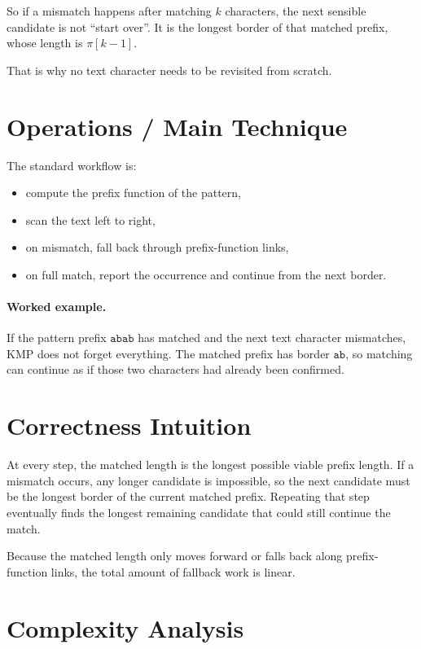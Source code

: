 So if a mismatch happens after matching \(k\) characters, the next sensible candidate is not ``start over''. It is the
longest border of that matched prefix, whose length is \(\pi[k - 1]\).

That is why no text character needs to be revisited from scratch.

\section*{Operations / Main Technique}

The standard workflow is:

\begin{itemize}
  \item compute the prefix function of the pattern,
  \item scan the text left to right,
  \item on mismatch, fall back through prefix-function links,
  \item on full match, report the occurrence and continue from the next border.
\end{itemize}

\paragraph{Worked example.}
If the pattern prefix \(\texttt{abab}\) has matched and the next text character mismatches, KMP does not forget
everything. The matched prefix has border \(\texttt{ab}\), so matching can continue as if those two characters had
already been confirmed.

\section*{Correctness Intuition}

At every step, the matched length is the longest possible viable prefix length. If a mismatch occurs, any longer
candidate is impossible, so the next candidate must be the longest border of the current matched prefix. Repeating that
step eventually finds the longest remaining candidate that could still continue the match.

Because the matched length only moves forward or falls back along prefix-function links, the total amount of fallback
work is linear.

\section*{Complexity Analysis}

